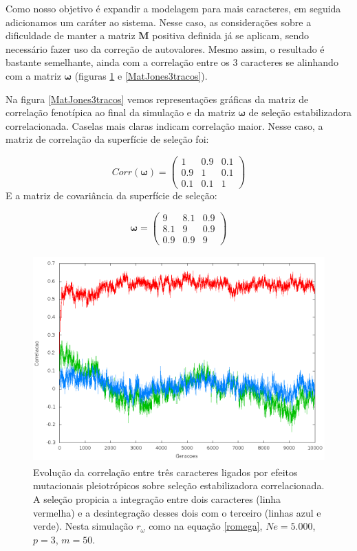 Como nosso objetivo é expandir a modelagem para mais caracteres, em seguida
adicionamos um caráter ao sistema.
Nesse caso, as considerações sobre a dificuldade de manter a matriz
$\mathbf{M}$
positiva definida já se aplicam, sendo necessário fazer uso da correção
de autovalores.
Mesmo assim, o resultado é bastante semelhante, ainda com a correlação
entre os 3 caracteres se alinhando com a matriz $\pmb{\omega}$ (figuras
\ref{jones3tracos} e \ref{MatJones3tracos}).


Na figura \ref{MatJones3tracos} vemos representações gráficas da matriz
de correlação fenotípica ao final da simulação e da matriz $\pmb{\omega}$ de
seleção estabilizadora correlacionada.
Caselas mais claras indicam correlação maior.
Nesse caso, a matriz de correlação da superfície de seleção foi:

\begin{equation}
    Corr(\pmb{\omega}) = \left( \begin{smallmatrix} 1 & 0.9 & 0.1\\  0.9 & 1 & 0.1 \\ 0.1 & 0.1 & 1 \end{smallmatrix}  \right)
    \label{romega}
\end{equation}
\newpage
E a matriz de covariância da superfície de seleção: 

\begin{equation}
    \pmb{\omega} = \left( \begin{smallmatrix} 9 & 8.1 & 0.9\\  8.1 & 9 & 0.9 \\ 0.9 & 0.9 & 9 \end{smallmatrix}  \right)
\end{equation}
                  

\begin{figure}[htbp]
    \centering
    \includegraphics[width=150mm, height=80mm]{figuras/jones3tracos.png}
    \caption{Evolução da correlação entre três caracteres ligados por efeitos
        mutacionais pleiotrópicos sobre seleção estabilizadora correlacionada.
        A seleção propicia a integração entre dois caracteres (linha vermelha) e a desintegração
        desses dois com o terceiro (linhas azul e verde).
        Nesta simulação $r_\omega$ como na equação \ref{romega},
        $Ne=5.000$, $p=3$, $m=50$.}
    \label{jones3tracos}
\end{figure}

